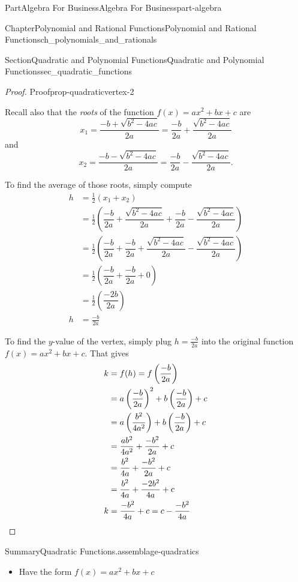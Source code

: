 \documentclass{tufte-book}
\numberwithin{equation}{chapter}
\newcommand{\qedhere}{\relax}
\newcommand{\amp}{&}
\begin{document}
\begin{partptx}{Part}{Algebra For Business}{}{Algebra For Business}{}{}{part-algebra}
\begin{chapterptx}{Chapter}{Polynomial and Rational Functions}{}{Polynomial and Rational Functions}{}{}{ch_polynomials_and_rationals}
\begin{sectionptx}{Section}{Quadratic and Polynomial Functions}{}{Quadratic and Polynomial Functions}{}{}{sec_quadratic_functions}
\begin{proof}{Proof}{}{prop-quadraticvertex-2}
\par
Recall also that the \emph{roots} of the function \(f(x)=ax^2+ bx + c\) are%
\begin{equation*}
x_1 = \dfrac{-b + \sqrt{b^2 - 4ac}}{2a}= \dfrac{-b}{2a} + \dfrac{\sqrt{b^2 - 4ac}}{2a} 
\end{equation*}
and%
\begin{equation*}
x_2 = \dfrac{-b - \sqrt{b^2 - 4ac}}{2a}= \dfrac{-b}{2a} - \dfrac{\sqrt{b^2 - 4ac}}{2a} \text{.}
\end{equation*}
%
\par
To find the average of those roots, simply compute%
\begin{align*}
h  \amp =  \frac{1}{2} (x_1 + x_2) \\
\amp = \frac{1}{2} \left( \dfrac{-b}{2a} + \dfrac{\sqrt{b^2 - 4ac}}{2a} + \dfrac{-b}{2a} - \dfrac{\sqrt{b^2 - 4ac}}{2a} \right)  \\
\amp = \frac{1}{2} \left( \dfrac{-b}{2a}  + \dfrac{-b}{2a} + \dfrac{\sqrt{b^2 - 4ac}}{2a} - \dfrac{\sqrt{b^2 - 4ac}}{2a} \right)  \\
\amp = \frac{1}{2} \left( \dfrac{-b}{2a}  + \dfrac{-b}{2a} + 0 \right)\\
\amp = \frac{1}{2} \left( \dfrac{-2b}{2a}\right)\\
h \amp = \frac{-b}{2a}
\end{align*}
%
\par
To find the \(y\)-value of the vertex, simply plug \(h=\frac{-b}{2a}\) into the original function \(f(x)=ax^2 + bx + c\).  That gives%
\begin{align*}
k \amp = f(h) = f\left(\dfrac{-b}{2a}\right)\\
\amp = a \left(\dfrac{-b}{2a}\right)^2 + b\left(\dfrac{-b}{2a}\right) + c \\
\amp =  a \left(\dfrac{b^2}{4a^2}\right) + b\left(\dfrac{-b}{2a}\right) + c\\
\amp = \dfrac{a b^2}{4a^2}  + \dfrac{-b^2}{2a} + c\\
\amp = \dfrac{b^2}{4a}  + \dfrac{-b^2}{2a} + c\\
\amp = \dfrac{b^2}{4a}  + \dfrac{-2b^2}{4a} + c\\
k \amp = \dfrac{-b^2}{4a} + c = c - \dfrac{-b^2}{4a}\qedhere
\end{align*}
%
\end{proof}
\begin{assemblage}{Summary}{Quadratic Functions.}{assemblage-quadratics}%
%
\begin{itemize}[label=\textbullet]
\item{}Have the form \(f(x) = ax^2 + bx + c\)%

\end{itemize}
\end{assemblage}
\end{sectionptx}
\end{chapterptx}
\end{partptx}
\end{document}
